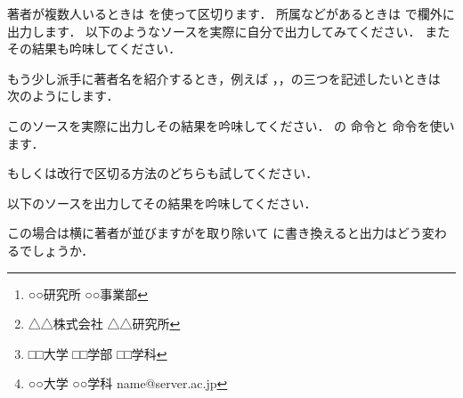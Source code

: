 \begin{Exe} %
著者が複数人いるときは を使って区切ります．
所属などがあるときは で欄外に出力します．
以下のようなソースを実際に自分で出力してみてください．
またその結果も吟味してください．

\begin{InTeX}
\author{夏目漱石\thanks{○○研究所 ○○事業部}  \and
        福澤諭吉\thanks{△△株式会社 △△研究所}\and
        芥川龍之介\thanks{□□大学 □□学部 □□学科}}
\end{InTeX}
\end{Exe}

\begin{Exe} 
もう少し派手に著者名を紹介するとき，例えば
，，の三つを記述したいときは
次のようにします．

\begin{InTeX}
\author{日本太郎\\ ○○大学 □□学科\\ name@server.ac.jp}
\end{InTeX}

このソースを実際に出力しその結果を吟味してください．
の 命令と 命令を使います．

\begin{InTeX}
\author{夏目漱石\thanks{○○大学 ○○学科 name@server.ac.jp}}
\end{InTeX}

もしくは改行で区切る方法のどちらも試してください．

\end{Exe}

\begin{Prob}\label{prob:maketitle:and}
 以下のソースを出力してその結果を吟味してください．

\begin{InTeX}
\author{夏目漱石 \\  ○○研究所 \\ ○○事業部  \and
        福澤諭吉 \\  △△株式会社 \\ △△究所\and
        芥川龍之介\\ □□大学 □□学部 \\ □□学科}
\end{InTeX}

この場合は横に著者が並びますがを取り除いて
\qu{\texttt{\bs\bs}}に書き換えると出力はどう変わるでしょうか．
\end{Prob}

